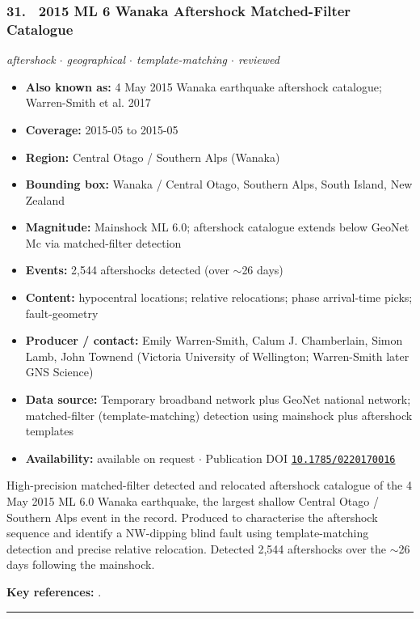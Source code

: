 \documentclass[10pt,a4paper]{article}
\newcommand{\catentryrule}{\par\vspace{3pt}\noindent\textcolor{rulegrey}{\rule{\linewidth}{0.3pt}}\par\vspace{5pt}}
\newcommand{\kv}[2]{\item \textbf{#1:} #2}
\begin{document}
\subsubsection*{\hypertarget{c:31}{31.}~ 2015 ML 6 Wanaka Aftershock Matched-Filter Catalogue}
{\small\itshape aftershock $\cdot$ geographical $\cdot$ template-matching $\cdot$ reviewed}\par\vspace{2pt}
\begin{itemize}[leftmargin=1.3em,itemsep=0.6pt,topsep=1pt,parsep=0pt]
\kv{Also known as}{4 May 2015 Wanaka earthquake aftershock catalogue; Warren-Smith et al. 2017}
\kv{Coverage}{2015-05 to 2015-05}
\kv{Region}{Central Otago / Southern Alps (Wanaka)}
\kv{Bounding box}{Wanaka / Central Otago, Southern Alps, South Island, New Zealand}
\kv{Magnitude}{Mainshock ML 6.0; aftershock catalogue extends below GeoNet Mc via matched-filter detection}
\kv{Events}{2,544 aftershocks detected (over $\sim$26 days)}
\kv{Content}{hypocentral locations; relative relocations; phase arrival-time picks; fault-geometry}
\kv{Producer / contact}{Emily Warren-Smith, Calum J. Chamberlain, Simon Lamb, John Townend (Victoria University of Wellington; Warren-Smith later GNS Science)}
\kv{Data source}{Temporary broadband network plus GeoNet national network; matched-filter (template-matching) detection using mainshock plus aftershock templates}
\kv{Availability}{available on request $\cdot$ Publication DOI \href{https://doi.org/10.1785/0220170016}{\nolinkurl{10.1785/0220170016}}}
\end{itemize}
\par\vspace{2pt}High-precision matched-filter detected and relocated aftershock catalogue of the 4 May 2015 ML 6.0 Wanaka earthquake, the largest shallow Central Otago / Southern Alps event in the record. Produced to characterise the aftershock sequence and identify a NW-dipping blind fault using template-matching detection and precise relative relocation. Detected 2,544 aftershocks over the $\sim$26 days following the mainshock.
\par\vspace{2pt}\textbf{Key references:} \cite{WarrenSmith2017}.
\catentryrule
\end{document}
